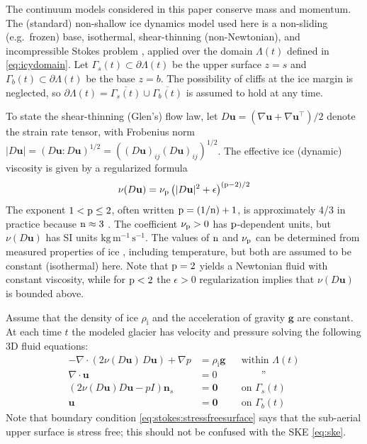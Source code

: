 \documentclass[hidelinks,onefignum,onetabnum,final]{siamart220329}  %
\newcommand{\eps}{\epsilon}
\newcommand{\grad}{\nabla}
\newcommand{\bg}{\mathbf{g}}
\newcommand{\bn}{\mathbf{n}}
\newcommand{\bu}{\mathbf{u}}
\newcommand{\bzero}{\bm{0}}
\newcommand{\nn}{{\text{\textnormal{n}}}}
\newcommand{\pp}{{\text{\textnormal{p}}}}
\newcommand{\rhoi}{\rho_{\text{i}}}
\begin{document}
The continuum models considered in this paper conserve mass and momentum.   The (standard) non-shallow ice dynamics model used here is a non-sliding (e.g.~frozen) base, isothermal, shear-thinning (non-Newtonian), and incompressible Stokes problem \cite{GreveBlatter2009,JouvetRappaz2011,SchoofHewitt2013}, applied over the domain $\Lambda(t)$ defined in \eqref{eq:icydomain}.  Let $\Gamma_s(t) \subset \partial \Lambda(t)$ be the upper surface $z=s$ and $\Gamma_b(t) \subset \partial \Lambda(t)$ be the base $z=b$.  The possibility of cliffs at the ice margin is neglected, so $\partial \Lambda(t) = \overline{\Gamma_s(t)} \cup \overline{\Gamma_b(t)}$ is assumed to hold at any time.

To state the shear-thinning (Glen's) flow law, let $D\bu=(\grad \bu + \grad \bu^{\top})/2$ denote the strain rate tensor, with Frobenius norm $|D\bu| = (D\bu:D\bu)^{1/2} = \left((D\bu)_{ij} (D\bu)_{ij}\right)^{1/2}$.  The effective ice (dynamic) viscosity \cite{GreveBlatter2009} is given by a regularized formula
\begin{equation}
\nu(D\bu) = \nu_\pp \left(|D\bu|^2 + \eps\right)^{(\pp-2)/2} \label{eq:glen}
\end{equation}
The exponent $1 < \pp \le 2$, often written $\pp=(1/\nn)+1$, is approximately 4/3 in practice because $\nn\approx 3$ \cite{GreveBlatter2009}.  The coefficient $\nu_\pp>0$ has $\pp$-dependent units, but $\nu(D\bu)$ has SI units $\text{kg}\,\text{m}^{-1}\,\text{s}^{-1}$.  The values of $\nn$ and $\nu_\pp$ can be determined from measured properties of ice \cite{GoldsbyKohlstedt2001,GreveBlatter2009}, including temperature, but both are assumed to be constant (isothermal) here.  Note that $\pp=2$ yields a Newtonian fluid with constant viscosity, while for $\pp < 2$ the $\eps>0$ regularization implies that $\nu(D\bu)$ is bounded above.

Assume that the density of ice $\rhoi$ and the acceleration of gravity $\bg$ are constant.  At each time $t$ the modeled glacier has velocity and pressure solving the following 3D fluid equations:
\begin{subequations}
\label{eq:stokes}
\begin{align}
- \nabla \cdot \left(2 \nu(D\bu)\, D\bu\right) + \nabla p &= \rhoi \bg && \text{within $\Lambda(t)$} \\
\nabla \cdot \bu &= 0 && \qquad \text{''} \label{eq:stokes:incomp} \\
\left(2 \nu(D\bu) D\bu - pI\right) \bn_s &= \bzero && \text{on $\Gamma_s(t)$}\label{eq:stokes:stressfreesurface} \\
\bu  &= \bzero && \text{on $\Gamma_b(t)$} \label{eq:stokes:noslide}
\end{align}
\end{subequations}
Note that boundary condition \eqref{eq:stokes:stressfreesurface} says that the sub-aerial upper surface is stress free; this should not be confused with the SKE \eqref{eq:ske}.
\end{document}
